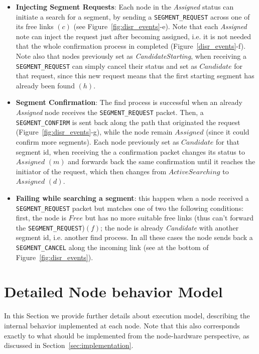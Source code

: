 \begin{itemize}
\item{\textbf{Injecting Segment Requests}}: Each node in the
\emph{Assigned} status can initiate a search for a segment, by sending
a \texttt{SEGMENT\_REQUEST} across one of its free links $(c)$ (see
Figure~\ref{fig:disr_events}-e). 
Note that each \emph{Assigned} note can inject the request just after
becoming assigned, i.e. it is not needed that the whole confirmation
process in completed (Figure~\ref{disr_events}-f).
Note also that nodes previously set as \emph{CandidateStarting}, when receiving 
a \texttt{SEGMENT\_REQUEST} can simply cancel their
status and set as $Candidate$ for that request, since this new
request means that the first starting segment has already been found $(h)$. 
\item{\textbf{Segment Confirmation}}: The find process is successful
when an already \emph{Assigned} node receives the
\texttt{SEGMENT\_REQUEST} packet. Then, a \texttt{SEGMENT\_CONFIRM} is
sent back along the path that originated the request
(Figure~\ref{fig:disr_events}-g), while the
node remain $Assigned$ (since it could confirm more segments). Each node
previously set as $Candidate$ for that segment id, when receiving the
a confirmation packet changes its status to $Assigned$ $(m)$ and forwards back
the same confirmation until it reaches the initiator of the request,
which then changes from $ActiveSearching$ to $Assigned$ $(d)$.

\item{\textbf{Failing while searching a segment}}: this happen when a node received a \texttt{SEGMENT\_REQUEST} packet but
matches one of two the following conditions: first, the node is $Free$ but has no
more suitable free links (thus can’t forward the
\texttt{SEGMENT\_REQUEST})$(f)$; the node
is already \emph{Candidate} with another segment id, i.e. another find
process.  In all these cases the node
sends back a \texttt{SEGMENT\_CANCEL} along the incoming link (see at
the bottom of Figure~\ref{fig:disr_events}).
\end{itemize}


\section{Detailed Node behavior Model}
\label{sec:execution_model}

In this Section we provide further details about \disr{}
execution model, describing the internal behavior implemented at
each node. Note that this also corresponds exactly to what should be
implemented from the node-hardware perspective, as discussed in
Section~\ref{sec:implementation}.

